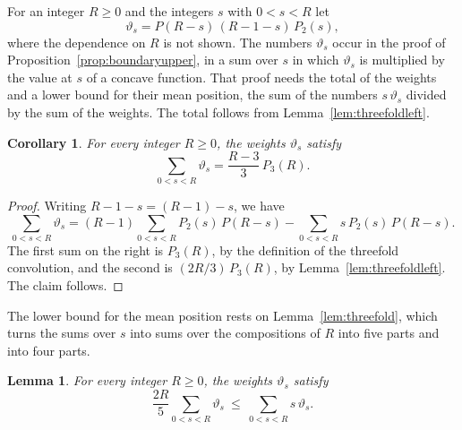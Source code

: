 \documentclass{amsart}
\newtheorem{lemma}[theorem]{Lemma}
\newtheorem{corollary}[theorem]{Corollary}
\theoremstyle{definition}
\theoremstyle{remark}
\numberwithin{equation}{section}
\begin{document}
For
an integer $R\ge0$ and the integers $s$ with $0<s<R$ let
\[
\vartheta_s=P(R-s)\,(R-1-s)\,P_2(s),
\]
where the dependence on $R$ is not shown. The numbers $\vartheta_s$ occur
in the proof of Proposition~\ref{prop:boundaryupper}, in a sum
over $s$ in which $\vartheta_s$ is multiplied by the value at $s$ of a
concave function. That proof needs the total of the weights and a lower
bound for their mean position, the sum of the numbers $s\,\vartheta_s$
divided by the sum of the weights. The total follows from
Lemma~\ref{lem:threefoldleft}.

\begin{corollary}\label{cor:weightsum}
For every integer $R\ge0$, the weights $\vartheta_s$ satisfy
\[
\sum_{0<s<R}\vartheta_s=\frac{R-3}{3}\,P_3(R).
\]
\end{corollary}

\begin{proof}
Writing $R-1-s=(R-1)-s$, we have
\[
\sum_{0<s<R}\vartheta_s
=(R-1)\sum_{0<s<R}P_2(s)\,P(R-s)-\sum_{0<s<R}s\,P_2(s)\,P(R-s).
\]
The first sum on the right is $P_3(R)$, by the definition of the threefold
convolution, and the second is $(2R/3)\,P_3(R)$, by
Lemma~\ref{lem:threefoldleft}. The claim follows.
\end{proof}

The lower bound for the mean position rests on Lemma~\ref{lem:threefold},
which turns the sums over $s$ into sums over the compositions of $R$ into
five parts and into four parts.

\begin{lemma}\label{lem:weightmean}
For every integer $R\ge0$, the weights $\vartheta_s$ satisfy
\[
\frac{2R}{5}\sum_{0<s<R}\vartheta_s\ \le\ \sum_{0<s<R}s\,\vartheta_s.
\]
\end{lemma}
\end{document}

